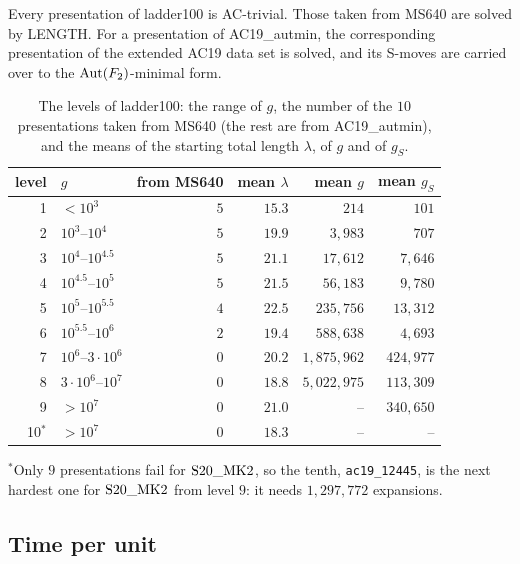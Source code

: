 Every presentation of ladder100 is AC-trivial. Those taken from MS640 are solved by LENGTH. For a presentation of
AC19\_autmin, the corresponding presentation of the extended AC19 data set is solved, and its S-moves are carried over to
the $\operatorname{Aut}(F_2)$-minimal form.

\begin{table}[ht]
\centering
\begin{tabular}{rlrrrr}
\toprule
level & $g$ & from MS640 & mean $\lambda$ & mean $g$ & mean $g_S$\\
\midrule
1 & $<10^3$ & $5$ & $15.3$ & $214$ & $101$\\
2 & $10^3$--$10^4$ & $5$ & $19.9$ & $3{,}983$ & $707$\\
3 & $10^4$--$10^{4.5}$ & $5$ & $21.1$ & $17{,}612$ & $7{,}646$\\
4 & $10^{4.5}$--$10^5$ & $5$ & $21.5$ & $56{,}183$ & $9{,}780$\\
5 & $10^5$--$10^{5.5}$ & $4$ & $22.5$ & $235{,}756$ & $13{,}312$\\
6 & $10^{5.5}$--$10^6$ & $2$ & $19.4$ & $588{,}638$ & $4{,}693$\\
7 & $10^6$--$3\cdot10^6$ & $0$ & $20.2$ & $1{,}875{,}962$ & $424{,}977$\\
8 & $3\cdot10^6$--$10^7$ & $0$ & $18.8$ & $5{,}022{,}975$ & $113{,}309$\\
9 & $>10^7$ & $0$ & $21.0$ & -- & $340{,}650$\\
10$^{*}$ & $>10^7$ & $0$ & $18.3$ & -- & --\\
\bottomrule
\end{tabular}

\smallskip
{\small $^{*}$Only $9$ presentations fail for $\mathrm{S20\_MK2}$, so the tenth, \texttt{ac19\_12445}, is the next hardest one for
$\mathrm{S20\_MK2}$ from level $9$: it needs $1{,}297{,}772$ expansions.}
\caption{The levels of ladder100: the range of $g$, the number of the $10$ presentations taken from MS640 (the rest
are from AC19\_autmin), and the means of the starting total length $\lambda$, of $g$ and of $g_S$.}
\label{tab:ladder}
\end{table}

\subsection{Time per unit}\label{app:time}

